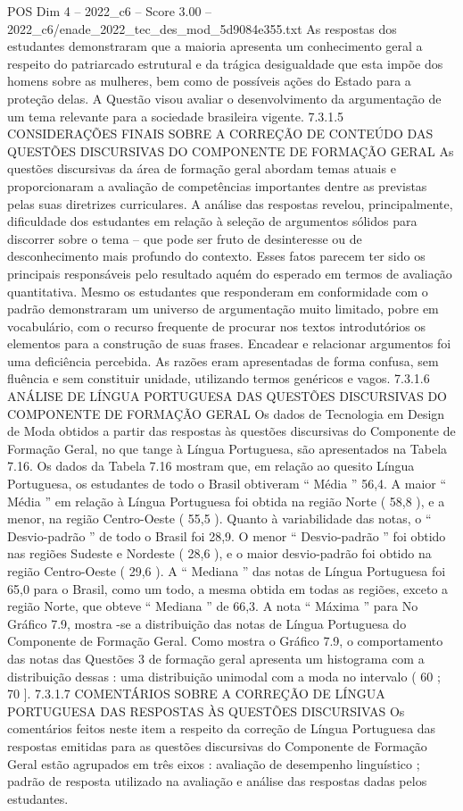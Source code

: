\begin{textsample}{POS Dim 4 – 2022\_c6 – Score 3.00 – 2022\_c6/enade\_2022\_tec\_des\_mod\_5d9084e355.txt}
As respostas dos estudantes demonstraram que a maioria apresenta um conhecimento geral a respeito do patriarcado estrutural e da trágica desigualdade que esta impõe dos homens sobre as mulheres, bem como de possíveis ações do Estado para a proteção delas.
A Questão visou avaliar o desenvolvimento da argumentação de um tema relevante para a sociedade brasileira vigente. 7.3.1.5 CONSIDERAÇÕES FINAIS SOBRE A CORREÇÃO DE CONTEÚDO DAS QUESTÕES DISCURSIVAS DO COMPONENTE DE FORMAÇÃO GERAL As questões discursivas da área de formação geral abordam temas atuais e proporcionaram a avaliação de competências importantes dentre as previstas pelas suas diretrizes curriculares.
A análise das respostas revelou, principalmente, dificuldade dos estudantes em relação à seleção de argumentos sólidos para discorrer sobre o tema – que pode ser fruto de desinteresse ou de desconhecimento mais profundo do contexto.
Esses fatos parecem ter sido os principais responsáveis pelo resultado aquém do esperado em termos de avaliação quantitativa.
Mesmo os estudantes que responderam em conformidade com o padrão demonstraram um universo de argumentação muito limitado, pobre em vocabulário, com o recurso frequente de procurar nos textos introdutórios os elementos para a construção de suas frases.
Encadear e relacionar argumentos foi uma deficiência percebida.
As razões eram apresentadas de forma confusa, sem fluência e sem constituir unidade, utilizando termos genéricos e vagos. 7.3.1.6 ANÁLISE DE LÍNGUA PORTUGUESA DAS QUESTÕES DISCURSIVAS DO COMPONENTE DE FORMAÇÃO GERAL Os dados de Tecnologia em Design de Moda obtidos a partir das respostas às questões discursivas do Componente de Formação Geral, no que tange à Língua Portuguesa, são apresentados na Tabela 7.16.
Os dados da Tabela 7.16 mostram que, em relação ao quesito Língua Portuguesa, os estudantes de todo o Brasil obtiveram “ Média ” 56,4.
A maior “ Média ” em relação à Língua Portuguesa foi obtida na região Norte ( 58,8 ), e a menor, na região Centro-Oeste ( 55,5 ).
Quanto à variabilidade das notas, o “ Desvio-padrão ” de todo o Brasil foi 28,9.
O menor “ Desvio-padrão ” foi obtido nas regiões Sudeste e Nordeste ( 28,6 ), e o maior desvio-padrão foi obtido na região Centro-Oeste ( 29,6 ).
A “ Mediana ” das notas de Língua Portuguesa foi 65,0 para o Brasil, como um todo, a mesma obtida em todas as regiões, exceto a região Norte, que obteve “ Mediana ” de 66,3.
A nota “ Máxima ” para No Gráfico 7.9, mostra -se a distribuição das notas de Língua Portuguesa do Componente de Formação Geral.
Como mostra o Gráfico 7.9, o comportamento das notas das Questões 3 de formação geral apresenta um histograma com a distribuição dessas : uma distribuição unimodal com a moda no intervalo ( 60 ; 70 ]. 7.3.1.7 COMENTÁRIOS SOBRE A CORREÇÃO DE LÍNGUA PORTUGUESA DAS RESPOSTAS ÀS QUESTÕES DISCURSIVAS Os comentários feitos neste item a respeito da correção de Língua Portuguesa das respostas emitidas para as questões discursivas do Componente de Formação Geral estão agrupados em três eixos : avaliação de desempenho linguístico ; padrão de resposta utilizado na avaliação e análise das respostas dadas pelos estudantes.

\end{textsample}
